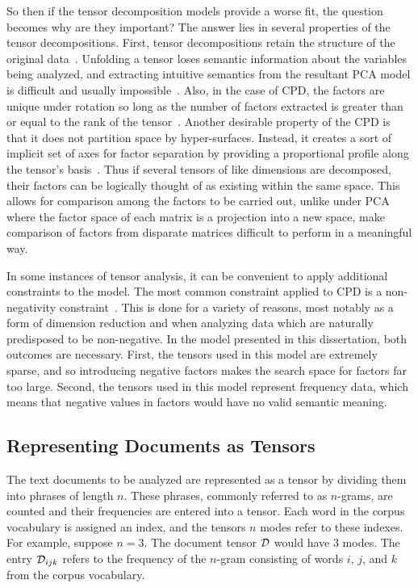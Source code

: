 \documentclass[../dissertation.tex]{subfiles}
\begin{document}
So then if the tensor decomposition models provide a worse fit, the
question becomes why are they important?  The answer lies in several
properties of the tensor decompositions.  First, tensor decompositions
retain the structure of the original data~\cite{harshman1970,
  kolda2009}.  Unfolding a tensor loses semantic information about the
variables being analyzed, and extracting intuitive semantics from the
resultant PCA model is difficult and usually
impossible~\cite{bro1997}.  Also, in the case of CPD, the factors are
unique under rotation so long as the number of factors extracted is
greater than or equal to the rank of the tensor~\cite{harshman1994}.
Another desirable property of the CPD is that it does not partition
space by hyper-surfaces.  Instead, it creates a sort of implicit set
of axes for factor separation by providing a proportional profile
along the tensor's basis~\cite{harshman1994}.  Thus if several tensors
of like dimensions are decomposed, their factors can be logically
thought of as existing within the same space.  This allows for
comparison among the factors to be carried out, unlike under PCA where
the factor space of each matrix is a projection into a new space, make
comparison of factors from disparate matrices difficult to perform in
a meaningful way.

In some instances of tensor analysis, it can be convenient to apply
additional constraints to the model.  The most common constraint
applied to CPD is a non-negativity constraint~\cite{liu2012sparse,
  bro1997, kolda2009}.  This is done for a variety of reasons, most
notably as a form of dimension reduction and when analyzing data which
are naturally predisposed to be non-negative.  In the model presented
in this dissertation, both outcomes are necessary.  First, the tensors
used in this model are extremely sparse, and so introducing negative
factors makes the search space for factors far too large.  Second, the
tensors used in this model represent frequency data, which means that
negative values in factors would have no valid semantic meaning.

\subsection{Representing Documents as Tensors}
The text documents to be analyzed are represented as a tensor by
dividing them into phrases of length $n$.  These phrases, commonly
referred to as $n$-grams, are counted and their frequencies are
entered into a tensor.  Each word in the corpus vocabulary is assigned
an index, and the tensors $n$ modes refer to these indexes.  For
example, suppose $n=3$.  The document tensor $\mathcal{D}$ would have
3 modes.  The entry $\mathcal{D}_{ijk}$ refers to the frequency of the
$n$-gram consisting of words $i$, $j$, and $k$ from the corpus
vocabulary.  
\end{document}
